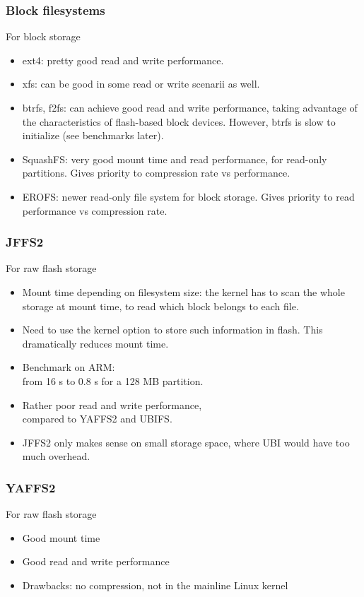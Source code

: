 \begin{frame}
\frametitle{Block filesystems}
For block storage
\begin{itemize}
\item ext4: pretty good read and write performance.
\item xfs: can be good in some read or write scenarii
      as well.
\item btrfs, f2fs: can achieve good read and write performance,
      taking advantage of the characteristics of flash-based block
      devices. However, btrfs is slow to initialize (see benchmarks later).
\item SquashFS: very good mount time and read performance, for read-only
      partitions. Gives priority to compression rate vs performance.
\item EROFS: newer read-only file system for block storage. Gives
      priority to read performance vs compression rate.
\end{itemize}
\end{frame}

\begin{frame}
\frametitle{JFFS2}
For raw flash storage
\begin{itemize}
\item Mount time depending on filesystem size: the kernel has to
      scan the whole storage at mount time, to read which block
      belongs to each file.
\item Need to use the  kernel option
      to store such information in flash. This dramatically reduces
      mount time.
\item Benchmark on ARM:\\
      from 16 s to 0.8 s for a 128 MB partition.
\item Rather poor read and write performance,\\
      compared to YAFFS2 and UBIFS.
\item JFFS2 only makes sense on small storage space,
      where UBI would have too much overhead.
\end{itemize}
\end{frame}

\begin{frame}
\frametitle{YAFFS2}
For raw flash storage
\begin{itemize}
\item Good mount time
\item Good read and write performance
\item Drawbacks: no compression, not in the mainline Linux kernel
\end{itemize}
\end{frame}

